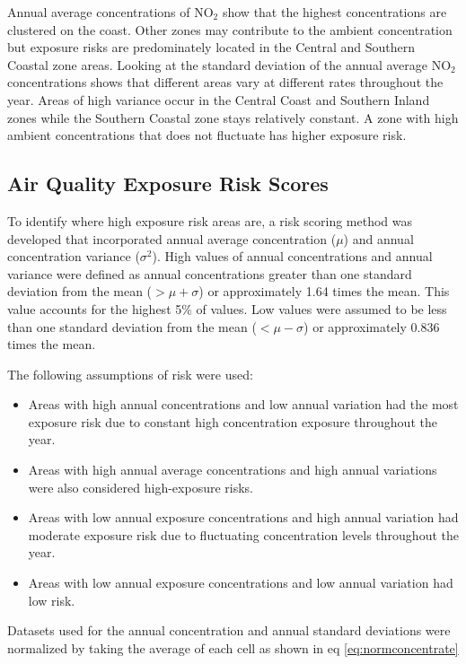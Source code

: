 Annual average concentrations of NO$_{2}$ show that the highest concentrations are clustered on the coast. Other zones may contribute to the ambient concentration but exposure risks are predominately located in the Central and Southern Coastal zone areas.  Looking at the standard deviation of the annual average NO$_{2}$ concentrations shows that different areas vary at different rates throughout the year. Areas of high variance occur in the Central Coast and Southern Inland zones while the Southern Coastal zone stays relatively constant.  A zone with high ambient concentrations that does not fluctuate has higher exposure risk. 

\subsection{Air Quality Exposure Risk Scores}

To identify where high exposure risk areas are, a risk scoring method was developed that incorporated annual average concentration ($\mu$) and annual concentration variance ($\sigma^{2}$).  High values of annual concentrations and annual variance were defined as annual concentrations greater than one standard deviation from the mean ($> \mu + \sigma$) or approximately 1.64 times the mean. This value accounts for the highest 5\% of values. Low values were assumed to be less than one standard deviation from the mean ($< \mu - \sigma$) or approximately 0.836 times the mean.

The following assumptions of risk were used:
\begin{itemize}
\item Areas with high annual concentrations and low annual variation had the most exposure risk due to constant high concentration exposure throughout the year.
\item Areas with high annual average concentrations and high annual variations were also considered high-exposure risks.
\item Areas with low annual exposure concentrations and high annual variation had moderate exposure risk due to fluctuating concentration levels throughout the year.
\item Areas with low annual exposure concentrations and low annual variation had low risk.
\end{itemize}

Datasets used for the annual concentration and annual standard deviations were normalized by taking the average of each cell as shown in eq \ref{eq:normconcentrate}

